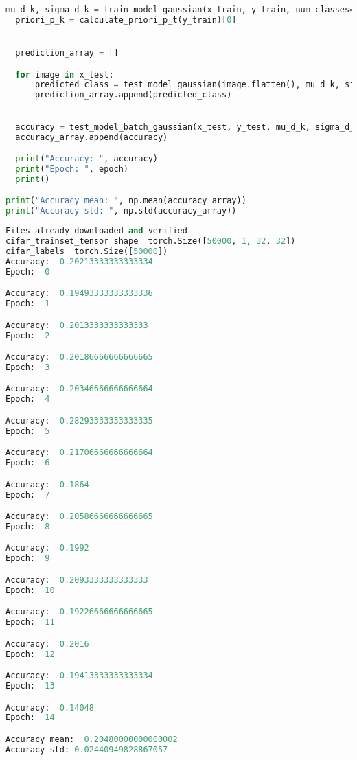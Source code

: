 \documentclass[spanish]{article}
\begin{document}
\begin{lstlisting}[language=Python, caption=Entrenamiento con particion de datos]
  mu_d_k, sigma_d_k = train_model_gaussian(x_train, y_train, num_classes=10)
  priori_p_k = calculate_priori_p_t(y_train)[0]


  prediction_array = []

  for image in x_test:
      predicted_class = test_model_gaussian(image.flatten(), mu_d_k, sigma_d_k, priori_p_k)
      prediction_array.append(predicted_class)

  
  accuracy = test_model_batch_gaussian(x_test, y_test, mu_d_k, sigma_d_k, priori_p_k)
  accuracy_array.append(accuracy)

  print("Accuracy: ", accuracy)
  print("Epoch: ", epoch)
  print()

print("Accuracy mean: ", np.mean(accuracy_array))
print("Accuracy std: ", np.std(accuracy_array))
\end{lstlisting}

\begin{lstlisting}[language=Python, caption=Salida]
Files already downloaded and verified
cifar_trainset_tensor shape  torch.Size([50000, 1, 32, 32])
cifar_labels  torch.Size([50000])
Accuracy:  0.20213333333333334
Epoch:  0

Accuracy:  0.19493333333333336
Epoch:  1

Accuracy:  0.2013333333333333
Epoch:  2

Accuracy:  0.20186666666666665
Epoch:  3

Accuracy:  0.20346666666666664
Epoch:  4

Accuracy:  0.28293333333333335
Epoch:  5

Accuracy:  0.21706666666666664
Epoch:  6

Accuracy:  0.1864
Epoch:  7

Accuracy:  0.20586666666666665
Epoch:  8

Accuracy:  0.1992
Epoch:  9

Accuracy:  0.2093333333333333
Epoch:  10

Accuracy:  0.19226666666666665
Epoch:  11

Accuracy:  0.2016
Epoch:  12

Accuracy:  0.19413333333333334
Epoch:  13

Accuracy:  0.14048
Epoch:  14

Accuracy mean:  0.20480000000000002
Accuracy std: 0.02440949828867057
\end{lstlisting}
\end{document}

